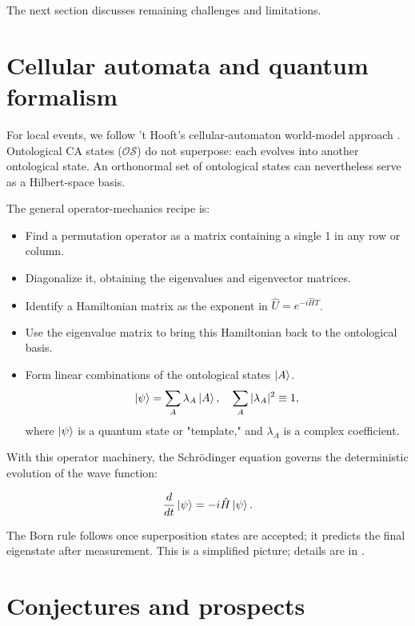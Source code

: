 \documentclass{ijuc}
\begin{document}
The next section discusses remaining challenges and limitations.


\section{Cellular automata and quantum formalism} \label{sec:bridge}

For local events, we follow 't Hooft's cellular-automaton world-model approach \cite{thooft}. Ontological CA states ($\mathcal{OS}$) do not superpose: each evolves into another ontological state. An orthonormal set of ontological states can nevertheless serve as a Hilbert-space basis.

The general operator-mechanics recipe is:

\begin{itemize}
    \item Find a permutation operator as a matrix containing a single 1 in any row or column.
    \item Diagonalize it, obtaining the eigenvalues and eigenvector matrices.
    \item Identify a Hamiltonian matrix as the exponent in $\hat{U}=e^{-i\hat{H}T}$.
    \item Use the eigenvalue matrix to bring this Hamiltonian back to the ontological basis.
    \item Form linear combinations of the ontological states $\ket{A}$.
\[
\ket{\psi} = \sum_A \lambda_A \ket{A}, \quad \sum_A |\lambda_A|^2 \equiv 1,
\]
where $\ket{\psi}$ is a quantum state or "template," and $\lambda_A$ is a complex coefficient.
\end{itemize}

With this operator machinery, the Schrödinger equation governs the deterministic evolution of the wave function:

\[
\frac{d}{dt}\ket{\psi} = -i\hat{H}\ket{\psi}.
\]

The Born rule follows once superposition states are accepted; it predicts the final eigenstate after measurement. This is a simplified picture; details are in \cite{thooft,Elze2019,rizzo2020perturbing}.


\section{Conjectures and prospects\label{sec:Prospects-and-conjectures}}
\end{document}

